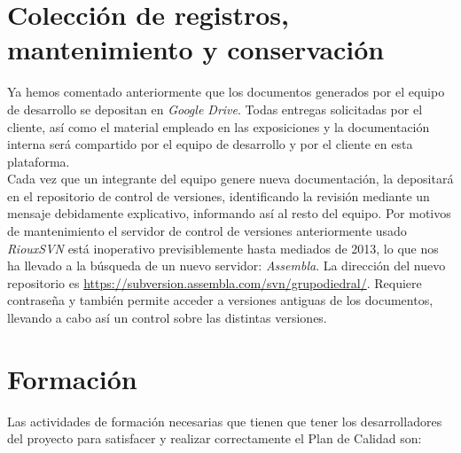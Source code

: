 \documentclass[11pt, a4paper, twoside, titlepage]{article}
\begin{document}

	\section{Colección de registros, mantenimiento y conservación} %
		Ya hemos comentado anteriormente que los documentos generados por el equipo de desarrollo se depositan en \textit{Google Drive}. Todas entregas solicitadas por el cliente, así como el material empleado en las exposiciones y la documentación interna será compartido por el equipo de desarrollo y por el cliente en esta plataforma. \\

		Cada vez que un integrante del equipo genere nueva documentación, la depositará en el repositorio de control de versiones,  identificando la revisión mediante un mensaje debidamente explicativo, informando así al resto del equipo. Por motivos de mantenimiento el servidor de control de versiones anteriormente usado \textit{RiouxSVN} está inoperativo previsiblemente hasta mediados de 2013, lo que nos ha llevado a la búsqueda de un nuevo servidor: \textit{Assembla}. La dirección del nuevo repositorio es \url{https://subversion.assembla.com/svn/grupodiedral/}. Requiere contraseña y también permite acceder a versiones antiguas de los documentos, llevando a cabo así un control sobre las distintas versiones.

	\section{Formación} %
		Las actividades de formación necesarias que tienen que tener los desarrolladores del proyecto  para satisfacer y realizar correctamente el Plan de Calidad son:
\end{document}
